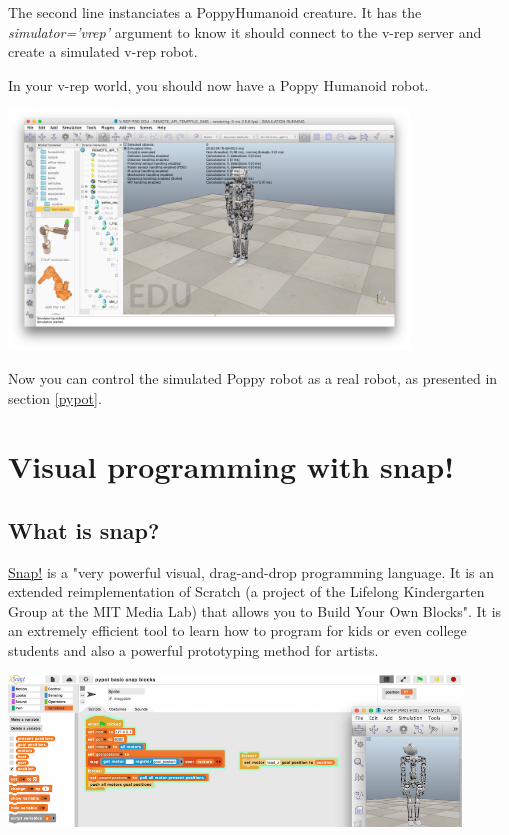 \documentclass{article}
\begin{document}
The second line instanciates a PoppyHumanoid creature. It has the \textit{simulator='vrep'} argument to know it should connect to the v-rep server and create a simulated v-rep robot.

In your v-rep world, you should now have a Poppy Humanoid robot.

 \begin{center}
  \includegraphics[width=0.8\textwidth]{img/vrep-poppy}
 \end{center}
   
Now you can control the simulated Poppy robot as a real robot, as presented in section \ref{pypot}.



\section{Visual programming with snap!}
\label{programming-with-snap}

\subsection{What is snap?}

\href{http://snap.berkeley.edu/}{Snap!} is a "very powerful visual, drag-and-drop programming language. It is an extended reimplementation of Scratch (a project of the Lifelong Kindergarten Group at the MIT Media Lab) that allows you to Build Your Own Blocks". It is an extremely efficient tool to learn how to program for kids or even college students and also a powerful prototyping method for artists.

 \begin{center}
  \includegraphics[width=0.9\textwidth]{img/snap-header}
 \end{center}
\end{document}
